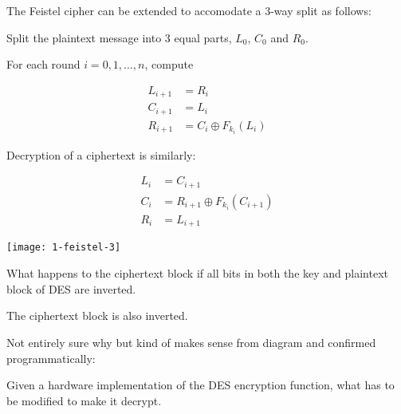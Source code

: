 \documentclass{supervision}
\begin{document}
\begin{questions}
      \begin{solution}
        The Feistel cipher can be extended to accomodate a 3-way split as
        follows:

        Split the plaintext message into 3 equal parts, $L_0$, $C_0$ and $R_0$.

        For each round $i = 0, 1, \ldots , n$, compute

        \begin{align*}
          L_{i+1} &= R_i                     \\
          C_{i+1} &= L_i                     \\
          R_{i+1} &= C_i \oplus F_{k_i}(L_i)
        \end{align*}

        Decryption of a ciphertext is similarly:

        \begin{align*}
          L_{i} &= C_{i+1}                         \\
          C_{i} &= R_{i+1} \oplus F_{k_i}(C_{i+1}) \\
          R_{i} &= L_{i+1}
        \end{align*}

        \begin{center}
          \texttt{[image: 1-feistel-3]}
        \end{center}
      \end{solution}

    \question What happens to the ciphertext block if all bits in both the key
      and plaintext block of DES are inverted.

      \begin{solution}
        The ciphertext block is also inverted.

        Not entirely sure why but kind of makes sense from diagram and
        confirmed programmatically:

      \end{solution}

    \question Given a hardware implementation of the DES encryption function,
      what has to be modified to make it decrypt.

  \end{questions}
\end{document}
